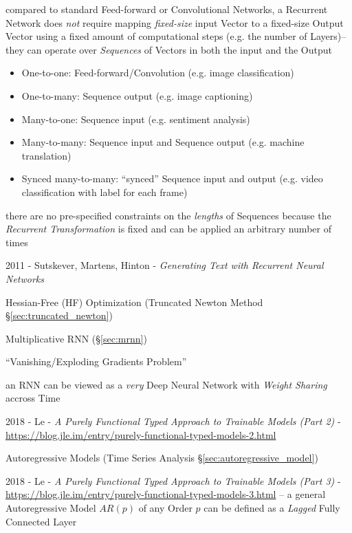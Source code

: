 compared to standard Feed-forward or Convolutional Networks, a Recurrent Network
does \emph{not} require mapping \emph{fixed-size} input Vector to a fixed-size
Output Vector using a fixed amount of computational steps (e.g. the number of
Layers)-- they can operate over \emph{Sequences} of Vectors in both the input
and the Output
\begin{itemize}
  \item One-to-one: Feed-forward/Convolution (e.g. image classification)
  \item One-to-many: Sequence output (e.g. image captioning)
  \item Many-to-one: Sequence input (e.g. sentiment analysis)
  \item Many-to-many: Sequence input and Sequence output (e.g. machine
    translation)
  \item Synced many-to-many: ``synced'' Sequence input and output (e.g. video
    classification with label for each frame)
\end{itemize}
there are no pre-specified constraints on the \emph{lengths} of Sequences
because the \emph{Recurrent Transformation} is fixed and can be applied an
arbitrary number of times

\asterism

2011 - Sutskever, Martens, Hinton -
  \emph{Generating Text with Recurrent Neural Networks}

Hessian-Free (HF) Optimization (Truncated Newton Method
\S\ref{sec:truncated_newton})

Multiplicative RNN (\S\ref{sec:mrnn})

``Vanishing/Exploding Gradients Problem''

an RNN can be viewed as a \emph{very} Deep Neural Network with \emph{Weight
  Sharing} accross Time

\asterism

2018 - Le -
\emph{A Purely Functional Typed Approach to Trainable Models (Part 2)} -
\url{https://blog.jle.im/entry/purely-functional-typed-models-2.html}

\fist Autoregressive Models (Time Series Analysis
\S\ref{sec:autoregressive_model})

2018 - Le -
\emph{A Purely Functional Typed Approach to Trainable Models (Part 3)} -
\url{https://blog.jle.im/entry/purely-functional-typed-models-3.html}
-- a general Autoregressive Model $AR(p)$ of any Order $p$ can be defined as a
\emph{Lagged} Fully Connected Layer



